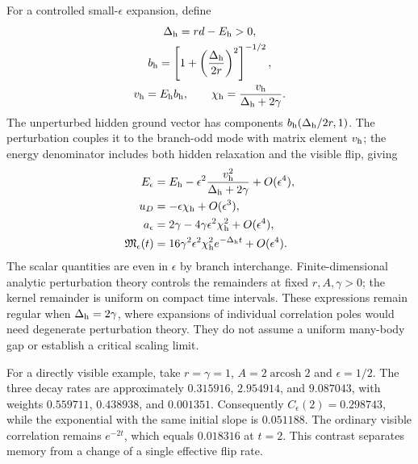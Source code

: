 \documentclass[aps,pre,reprint,amsmath,amssymb,longbibliography,floatfix]{revtex4-2}
\begin{document}
For a controlled small-$\epsilon$ expansion, define
\begin{equation}
 \begin{gathered}
 \Delta_{\rm h}=rd-E_{\rm h}>0,\\
 b_{\rm h}=\left[1+\left(\frac{\Delta_{\rm h}}{2r}\right)^2\right]^{-1/2},\\
 v_{\rm h}=E_{\rm h}b_{\rm h},\qquad
 \chi_{\rm h}=\frac{v_{\rm h}}{\Delta_{\rm h}+2\gamma}.
 \end{gathered}
 \label{eq:memory-small-parameters}
\end{equation}
The unperturbed hidden ground vector has components
$b_{\rm h}(\Delta_{\rm h}/2r,1)$. The perturbation couples it to the
branch-odd mode with matrix element $v_{\rm h}$; the energy denominator
includes both hidden relaxation and the visible flip, giving
\begin{align}
 E_\epsilon&=E_{\rm h}
 -\epsilon^2\frac{v_{\rm h}^2}{\Delta_{\rm h}+2\gamma}
 +O(\epsilon^4),\nonumber\\
 u_D&=-\epsilon\chi_{\rm h}+O(\epsilon^3),\nonumber\\
 a_\epsilon&=2\gamma-4\gamma\epsilon^2\chi_{\rm h}^2
 +O(\epsilon^4),\nonumber\\
 \mathfrak M_\epsilon(t)
 &=16\gamma^2\epsilon^2\chi_{\rm h}^2e^{-\Delta_{\rm h}t}
 +O(\epsilon^4).
 \label{eq:memory-small-expansion}
\end{align}
The scalar quantities are even in $\epsilon$ by branch interchange.
Finite-dimensional analytic perturbation theory controls the
remainders at fixed $r,A,\gamma>0$; the kernel remainder is uniform
on compact time intervals. These expressions remain regular when
$\Delta_{\rm h}=2\gamma$, where expansions of individual correlation
poles would need degenerate perturbation theory. They do not assume
a uniform many-body gap or establish a critical scaling limit.

For a directly visible example, take $r=\gamma=1$,
$A=2\operatorname{arcosh}2$ and $\epsilon=1/2$.
The three decay rates are approximately $0.315916$, $2.954914$,
and $9.087043$, with weights $0.559711$, $0.438938$, and $0.001351$.
Consequently $C_\epsilon(2)=0.298743$, while the exponential with
the same initial slope is $0.051188$. The ordinary visible
correlation remains $e^{-2t}$, which equals $0.018316$ at $t=2$.
This contrast separates memory from a change of a single effective
flip rate.


\end{document}
